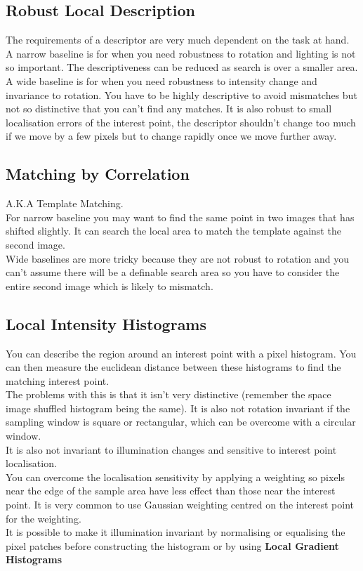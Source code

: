 \documentclass{article}
\begin{document}
	\subsection*{Robust Local Description}
	The requirements of a descriptor are very much dependent on the task at hand.\\
	A narrow baseline is for when you need robustness to rotation and lighting is not so important. The descriptiveness can be reduced as search is over a smaller area.\\
	A wide baseline is for when you need robustness to intensity change and invariance to rotation. You have to be highly descriptive to avoid mismatches but not so distinctive that you can't find any matches. It is also robust to small localisation errors of the interest point, the descriptor shouldn't change too much if we move by a few pixels but to change rapidly once we move further away.
	
	\subsection*{Matching by Correlation}
	A.K.A Template Matching.\\
	For narrow baseline you may want to find the same point in two images that has shifted slightly. It can search the local area to match the template against the second image.\\
	Wide baselines are more tricky because they are not robust to rotation and you can't assume there will be a definable search area so you have to consider the entire second image which is likely to mismatch.
	
	\subsection*{Local Intensity Histograms}
	You can describe the region around an interest point with a pixel histogram. You can then measure the euclidean distance between these histograms to find the matching interest point.\\
	The problems with this is that it isn't very distinctive (remember the space image shuffled histogram being the same). It is also not rotation invariant if the sampling window is square or rectangular, which can be overcome with a circular window.\\
	It is also not invariant to illumination changes and sensitive to interest point localisation.\\
	You can overcome the localisation sensitivity by applying a weighting so pixels near the edge of the sample area have less effect than those near the interest point. It is very common to use Gaussian weighting centred on the interest point for the weighting.\\
	It is possible to make it illumination invariant by normalising or equalising the pixel patches before constructing the histogram or by using {\bfseries Local Gradient Histograms}
	
\end{document}
